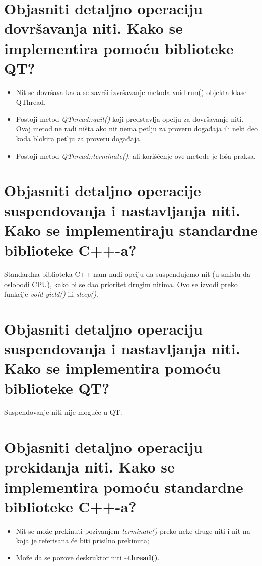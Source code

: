 \documentclass[a4paper]{article}
\begin{document}
\section{Objasniti detaljno operaciju dovršavanja niti. Kako se implementira pomoću biblioteke QT?}
  \begin{itemize}
    \item Nit se dovršava kada se završi izvršavanje metoda void run() objekta klase QThread.
    \item Postoji metod \textit{QThread::quit()} koji predstavlja opciju za dovršavanje niti.
          Ovaj metod ne radi ništa ako nit nema petlju za proveru događaja ili neki deo koda
          blokira petlju za proveru događaja.
    \item Postoji metod \textit{QThread::terminate()}, ali korišćenje ove metode je loša
          praksa.
  \end{itemize}
  

\section{Objasniti detaljno operacije suspendovanja i nastavljanja niti. Kako se implementiraju
         standardne biblioteke C++-a?}
  Standardna biblioteka C++ nam nudi opciju da suspendujemo nit (u smislu da oslobodi CPU),
  kako bi se dao prioritet drugim nitima. Ovo se izvodi preko funkcije \textit{void yield()}
  ili \textit{sleep()}. \cite{cppref_yield} 
  
\section{Objasniti detaljno operaciju suspendovanja i nastavljanja niti. 
         Kako se implementira pomoću biblioteke QT?}
  Suspendovanje niti nije moguće u QT.
  
\section{Objasniti detaljno operaciju prekidanja niti. Kako se implementira pomoću standardne
         biblioteke C++-a?}
  \begin{itemize}
    \item Nit se može prekinuti pozivanjem \textit{terminate()} preko neke druge niti i nit
          na koja je referisana će biti prisilno prekinuta;
    \item Može da se pozove deskruktor niti \textbf{\textasciitilde thread()}. 
  \end{itemize}
\end{document}
